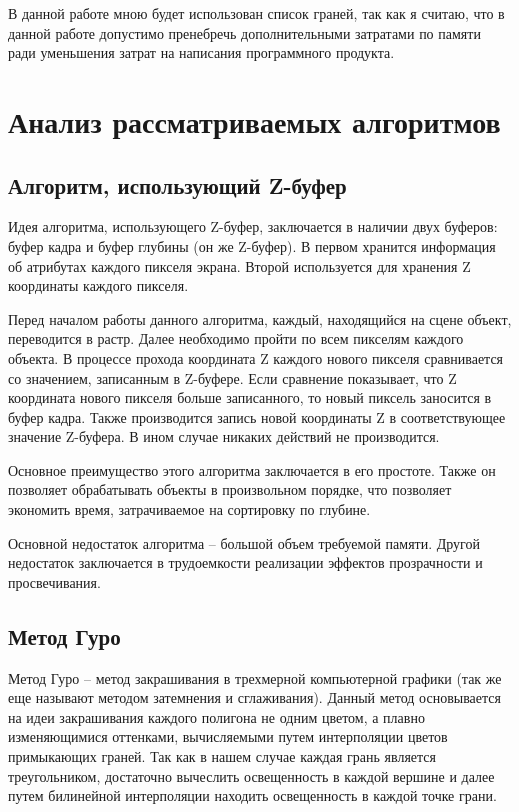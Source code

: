 \documentclass[12pt]{report}
\begin{document}
	В данной работе мною будет использован список граней, так как я считаю, что в данной работе допустимо пренебречь дополнительными затратами по памяти ради уменьшения затрат на написания программного продукта.

	\section{Анализ рассматриваемых алгоритмов}
	
	\subsection{Алгоритм, использующий Z-буфер}
	
	Идея алгоритма, использующего Z-буфер, заключается в наличии двух буферов: буфер кадра и буфер глубины (он же Z-буфер). В первом хранится информация об атрибутах каждого пикселя экрана. Второй используется для хранения Z координаты каждого пикселя. 
	
	Перед началом работы данного алгоритма, каждый, находящийся на сцене объект, переводится в растр. Далее необходимо пройти по всем пикселям каждого объекта. В процессе прохода координата Z каждого нового пикселя сравнивается со значением, записанным в Z-буфере. Если сравнение показывает, что Z координата нового пикселя больше записанного, то новый пиксель заносится в буфер кадра. Также производится запись новой координаты Z в соответствующее значение Z-буфера. В ином случае никаких действий не производится.
	
	Основное преимущество этого алгоритма заключается в его простоте. Также он позволяет обрабатывать объекты в произвольном порядке, что позволяет экономить время, затрачиваемое на сортировку по глубине.
	
	Основной недостаток алгоритма – большой объем требуемой памяти. Другой недостаток заключается в трудоемкости реализации эффектов прозрачности и просвечивания.

	\subsection{Метод Гуро}

	Метод Гуро – метод закрашивания в трехмерной компьютерной графики (так же еще называют методом затемнения и сглаживания). 
	Данный метод основывается на идеи закрашивания каждого полигона не одним цветом, а плавно изменяющимися оттенками, вычисляемыми путем интерполяции цветов примыкающих граней. Так как в нашем случае каждая грань является треугольником, достаточно вычеслить освещенность в каждой вершине и далее путем билинейной интерполяции находить освещенность в каждой точке грани. 
	
\end{document}
